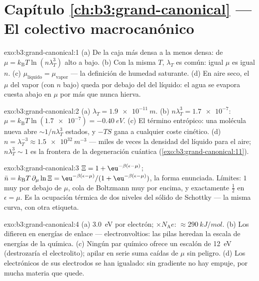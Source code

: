\section*{Capítulo \ref{ch:b3:grand-canonical} --- El colectivo macrocanónico}

\begin{solution}{exo:b3:grand-canonical:1}
(a) De la caja más densa a la menos densa: de $\mu =
k_{\text{B}}T\ln(n\lambda_T^3)$ alto a bajo. (b) Con la misma $T$,
$\lambda_T$ es común: igual $\mu$ es igual $n$. (c)
$\mu_{\text{líquido}} = \mu_{\text{vapor}}$ --- la definición de
humedad saturante. (d) En aire seco, el $\mu$ del vapor (con $n$ bajo)
queda por debajo del del líquido: el agua se evapora cuesta abajo en $\mu$
por más que nunca hierva.
\end{solution}

\begin{solution}{exo:b3:grand-canonical:2}
(a) $\lambda_T = \qty{1.9e-11}{m}$. (b) $n\lambda_T^3 =
\num{1.7e-7}$: $\mu = k_{\text{B}}T\ln(\num{1.7e-7}) =
\qty{-0.40}{eV}$. (c) El término entrópico: una molécula nueva abre
$\sim1/n\lambda_T^3$ estados, y $-TS$ gana a cualquier coste cinético.
(d) $n = \lambda_T^{-3} \approx \qty{1.5e32}{m^{-3}}$ ---
miles de veces la densidad del líquido para el aire; $n\lambda_T^3 \sim 1$
es la frontera de la degeneración cuántica
(\cref{exo:b3:grand-canonical:11}).
\end{solution}

\begin{solution}{exo:b3:grand-canonical:3}
$\Xi = 1 + \eu^{-\beta(\epsilon-\mu)}$; $\bar n = k_{\text{B}}T\,
\partial_\mu\ln\Xi = \eu^{-\beta(\epsilon-\mu)}/(1 +
\eu^{-\beta(\epsilon-\mu)})$, la forma enunciada. Límites: $1$ muy
por debajo de $\mu$, cola de Boltzmann muy por encima, y exactamente
$\tfrac12$ en $\epsilon = \mu$. Es la ocupación térmica de dos niveles del
sólido de Schottky --- la misma curva, con otra etiqueta.
\end{solution}

\begin{solution}{exo:b3:grand-canonical:4}
(a) \qty{3.0}{eV} por electrón; $\times N_{\text{A}}e$:
$\approx\qty{290}{kJ/mol}$. (b) Los  difieren en
energías de enlace --- electronvoltios: las pilas heredan la escala de
energías de la química. (c) Ningún par químico ofrece un escalón de
\qty{12}{eV} (destrozaría el electrolito); apilar en serie suma
caídas de $\mu$ sin peligro. (d) Los  electrónicos de
sus electrodos se han igualado: sin gradiente no hay empuje, por mucha
materia que quede.
\end{solution}


